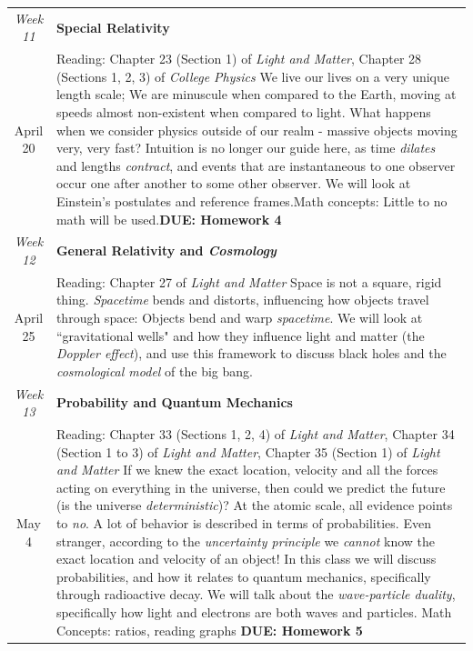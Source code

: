 \documentclass[12pt]{article}
\begin{document}
\noindent \begin{tabularx}{\textwidth}[c]{| c X |}
\hline
	\textit{Week 11} & \textbf{Special Relativity} \\ April 20 & Reading: Chapter 23 (Section 1) of \textit{Light and Matter}, Chapter 28 (Sections 1, 2, 3) of \textit{College Physics} \newline We live our lives on a very unique length scale; We are minuscule when compared to the Earth, moving at speeds almost non-existent when compared to light. What happens when we consider physics outside of our realm - massive objects moving very, very fast? Intuition is no longer our guide here, as time \textit{dilates} and lengths \textit{contract}, and events that are instantaneous to one observer occur one after another to some other observer. We will look at Einstein's postulates and reference frames.\newline Math concepts: Little to no math will be used.\newline \textbf{DUE: Homework 4}\\ \hline
	\textit{Week 12} & \textbf{General Relativity and \textit{Cosmology}} \\ April 25 & Reading: Chapter 27 of \textit{Light and Matter} \newline Space is not a square, rigid thing. \textit{Spacetime} bends and distorts, influencing how objects travel through space: Objects bend and warp \textit{spacetime}. We will look at ``gravitational wells" and how they influence light and matter (the \textit{Doppler effect}), and use this framework to discuss black holes and the \textit{cosmological model} of the big bang.\\ \hline
	\textit{Week 13} & \textbf{Probability and Quantum Mechanics} \\ May 4 & Reading: Chapter 33 (Sections 1, 2, 4) of \textit{Light and Matter}, Chapter 34 (Section 1 to 3) of \textit{Light and Matter}, Chapter 35 (Section 1) of \textit{Light and Matter} \newline If we knew the exact location, velocity and all the forces acting on everything in the universe, then could we predict the future (is the universe \textit{deterministic})? At the atomic scale, all evidence points to \textit{no}. A lot of behavior is described in terms of probabilities. Even stranger, according to the \textit{uncertainty principle} we \textit{cannot} know the exact location and velocity of an object! In this class we will discuss probabilities, and how it relates to quantum mechanics, specifically through radioactive decay. We will talk about the \textit{wave-particle duality}, specifically how light and electrons are both waves and particles. \newline Math Concepts: ratios, reading graphs \newline \textbf{DUE: Homework 5}\\ \hline

\end{tabularx}
\end{document}
